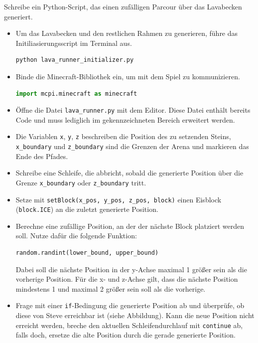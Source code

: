 \large Schreibe ein Python-Script, das einen zufälligen Parcour über das Lavabecken generiert.
\begin{itemize}
	\item Um das Lavabecken und den restlichen Rahmen zu generieren, führe das Initiliasierungsscript im Terminal aus.
	\begin{lstlisting}[language=sh]
python lava_runner_initializer.py
	\end{lstlisting}
	\item Binde die Minecraft-Bibliothek ein, um mit dem Spiel zu kommunizieren.
	\begin{lstlisting}[language=Python]
import mcpi.minecraft as minecraft
	\end{lstlisting}
	
	\item Öffne die Datei \texttt{lava\_runner.py} mit dem Editor. Diese Datei enthält bereits Code und muss lediglich im gekennzeichneten Bereich erweitert werden.
	
	\item Die Variablen \texttt{x}, \texttt{y}, \texttt{z} beschreiben die Position des zu setzenden Steins, \texttt{x\_boundary} und \texttt{z\_boundary} sind die Grenzen der Arena und markieren das Ende des Pfades.
	
	\item Schreibe eine Schleife, die abbricht, sobald die generierte Position über die Grenze \texttt{x\_boundary} oder \texttt{z\_boundary} tritt.

	\item Setze mit \texttt{setBlock(x\_pos, y\_pos, z\_pos, block)}  einen Eisblock (\texttt{block.ICE}) an die zuletzt generierte Position.

	\item Berechne eine zufällige Position, an der der nächste Block platziert werden soll. Nutze dafür die folgende Funktion:
		\begin{lstlisting}[language=Python]
random.randint(lower_bound, upper_bound)
		\end{lstlisting}
	Dabei soll die nächste Position in der y-Achse maximal 1 größer sein als die vorherige Position. Für die x- und z-Achse gilt, dass die nächste Position mindestens 1 und maximal 2 größer sein soll als die vorherige.
		
	\item Frage mit einer \texttt{if}-Bedingung die generierte Position ab und überprüfe, ob diese von Steve erreichbar ist (siehe Abbildung). Kann die neue Position nicht erreicht werden, breche den aktuellen Schleifendurchlauf mit \texttt{continue} ab, falls doch, ersetze die alte Position durch die gerade generierte Position.
\end{itemize}
